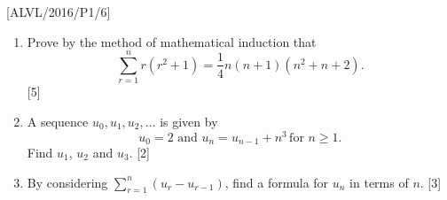 \item {[}ALVL/2016/P1/6{]}
\begin{enumerate}
\item Prove by the method of mathematical induction that 
\[
\sum_{r=1}^{n}r\left(r^{2}+1\right)=\frac{1}{4}n\left(n+1\right)\left(n^{2}+n+2\right).
\]
 \hfill{}{[}5{]}
\item A sequence $u_{0},u_{1},u_{2},\dots$ is given by 
\[
u_{0}=2\,\,\text{and}\,\,u_{n}=u_{n-1}+n^{3}\,\text{for }n\geq1.
\]
Find $u_{1}$, $u_{2}$ and $u_{3}$. \hfill{} {[}2{]}
\item By considering $\sum_{r=1}^{n}\left(u_{r}-u_{r-1}\right)$, find a
formula for $u_{n}$ in terms of $n$. \hfill{}{[}3{]}
\end{enumerate}
